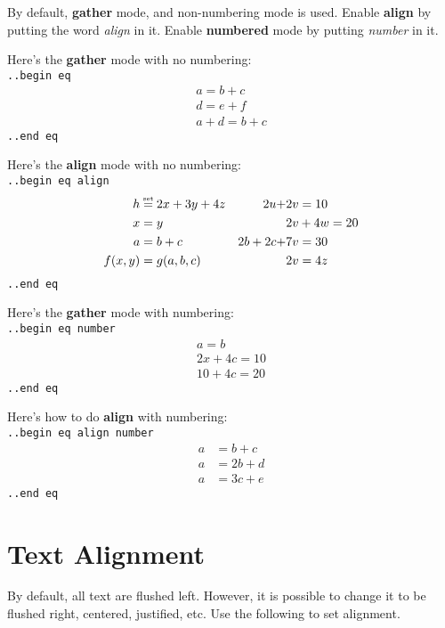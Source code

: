 \documentclass[12pt]{article}
\newcommand{\pytexset}{\mathrel{\stackrel{\makebox[0pt]{\mbox{\normalfont\tiny set}}}{=}}}
\begin{document}
\begin{flushleft}
\medskip

By default, \textbf{gather} mode, and non-numbering mode is used. Enable \textbf{align} by putting the word \emph{align} in it. Enable \textbf{numbered} mode by putting \emph{number} in it.

\medskip

Here's the \textbf{gather} mode with no numbering: \\
\verb|..begin eq|
\begin{gather*}
a = b + c \\
d = e + f \\
a + d = b + c 
\end{gather*}
\verb|..end eq|

\medskip

Here's the \textbf{align} mode with no numbering: \\
\verb|..begin eq align|
\begin{align*}
h &\pytexset 2x + 3y + 4z		&	2u + &2v = 10 \\
x &= y						&	&2v + 4w = 20 \\
a &= b + c					&	2b + 2c + &7v = 30\\
f(x, y) &= g(a, b, c)		&	&2v = 4z 
\end{align*}
\verb|..end eq|

\medskip

Here's the \textbf{gather} mode with numbering: \\
\verb|..begin eq number|
\begin{gather}
a = b \\
2x + 4c = 10 \\
10 + 4c = 20 
\end{gather}
\verb|..end eq|

\medskip

Here's how to do \textbf{align} with numbering: \\
\verb|..begin eq align number|
\begin{align}
a &= b + c \\
a &= 2b + d \\
a &= 3c + e 
\end{align}
\verb|..end eq|

\section{Text Alignment}

By default, all text are flushed left. However, it is possible to change it to be flushed right, centered, justified, etc. Use the following to set alignment.

\end{flushleft}
\end{document}
